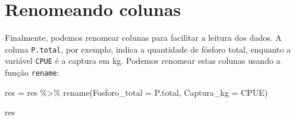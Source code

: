 \documentclass[
]{book}
\newenvironment{Shaded}{\begin{snugshade}}{\end{snugshade}}
\newcommand{\AttributeTok}[1]{\textcolor[rgb]{0.77,0.63,0.00}{#1}}
\newcommand{\FunctionTok}[1]{\textcolor[rgb]{0.00,0.00,0.00}{#1}}
\newcommand{\NormalTok}[1]{#1}
\newcommand{\OtherTok}[1]{\textcolor[rgb]{0.56,0.35,0.01}{#1}}
\newcommand{\SpecialCharTok}[1]{\textcolor[rgb]{0.00,0.00,0.00}{#1}}
\begin{document}
\hypertarget{renomeando-colunas}{%
\section{Renomeando colunas}\label{renomeando-colunas}}

Finalmente, podemos renomear colunas para facilitar a leitura dos dados. A coluna \texttt{P.total}, por exemplo, indica a quantidade de fósforo total, enquanto a variável \texttt{CPUE} é a captura em kg. Podemos renomear estas colunas usando a função \texttt{rename}:

\begin{Shaded}
\begin{Highlighting}[]
\NormalTok{res }\OtherTok{=}\NormalTok{ res }\SpecialCharTok{\%\textgreater{}\%} 
  \FunctionTok{rename}\NormalTok{(}\AttributeTok{Fosforo\_total =}\NormalTok{ P.total,}
         \AttributeTok{Captura\_kg =}\NormalTok{ CPUE)}

\NormalTok{res}
\end{Highlighting}
\end{Shaded}
\end{document}
